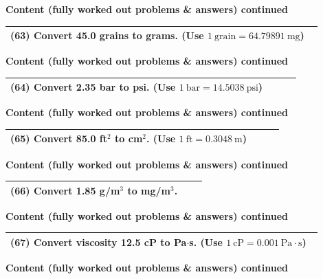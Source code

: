 \documentclass{article}
\begin{document}
\newpage
\noindent
{\large \textbf{Content (fully worked out problems \& answers) continued}} \\[0.2em]
\begin{tabular}{|p{0.9\linewidth}|}
\hline
\vspace{0.2cm}

\textbf{(63)} Convert 45.0 grains to grams. (Use $1~\text{grain}=64.79891~\text{mg}$) \\
\hline
\end{tabular}
\newpage
\noindent
{\large \textbf{Content (fully worked out problems \& answers) continued}} \\[0.2em]
\begin{tabular}{|p{0.9\linewidth}|}
\hline
\vspace{0.2cm}

\textbf{(64)} Convert 2.35 bar to psi. (Use $1~\text{bar}=14.5038~\text{psi}$) \\
\hline
\end{tabular}
\newpage
\noindent
{\large \textbf{Content (fully worked out problems \& answers) continued}} \\[0.2em]
\begin{tabular}{|p{0.9\linewidth}|}
\hline
\vspace{0.2cm}

\textbf{(65)} Convert 85.0 ft$^2$ to cm$^2$. (Use $1~\text{ft}=0.3048~\text{m}$) \\
\hline
\end{tabular}
\newpage
\noindent
{\large \textbf{Content (fully worked out problems \& answers) continued}} \\[0.2em]
\begin{tabular}{|p{0.9\linewidth}|}
\hline
\vspace{0.2cm}

\textbf{(66)} Convert 1.85 g/m$^3$ to mg/m$^3$. \\
\hline
\end{tabular}
\newpage
\noindent
{\large \textbf{Content (fully worked out problems \& answers) continued}} \\[0.2em]
\begin{tabular}{|p{0.9\linewidth}|}
\hline
\vspace{0.2cm}

\textbf{(67)} Convert viscosity 12.5 cP to Pa$\cdot$s. (Use $1~\text{cP}=0.001~\text{Pa}\cdot\text{s}$) \\
\hline
\end{tabular}
\newpage
\noindent
{\large \textbf{Content (fully worked out problems \& answers) continued}} \\[0.2em]
\end{document}
